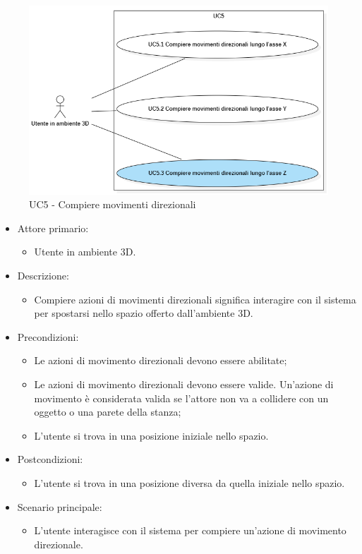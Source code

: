 \begin{figure}[H]
  \renewcommand{\thefigure}{4}
  \includegraphics[width=\linewidth]{./res/images/UC5.png}
  \caption{UC5 - Compiere movimenti direzionali}
  \label{fig:UC 5}
\end{figure}

\begin{itemize}

	\item Attore primario: 
	\begin{itemize}
		\item Utente in ambiente 3D.
	\end{itemize}
	\item Descrizione:
	\begin{itemize}
		\item Compiere azioni di movimenti direzionali significa interagire con il sistema per spostarsi nello spazio offerto dall'ambiente 3D.
	\end{itemize}
	
	\item Precondizioni:
	\begin{itemize}
		\item Le azioni di movimento direzionali devono essere abilitate;
		\item Le azioni di movimento direzionali devono essere valide. Un'azione di movimento è considerata valida se l'attore non va a collidere con un oggetto o una parete della stanza;
		\item L'utente si trova in una posizione iniziale nello spazio.
	\end{itemize}
	
	\item Postcondizioni:
	\begin{itemize}
		\item L'utente si trova in una posizione diversa da quella iniziale nello spazio.
	\end{itemize}
	
	\item Scenario principale:
	\begin{itemize}
		\item L'utente interagisce con il sistema per compiere un'azione di movimento direzionale.
	\end{itemize}
	
\end{itemize}


